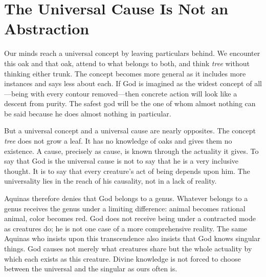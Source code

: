 \section{The Universal Cause Is Not an Abstraction}

Our minds reach a universal concept by leaving particulars behind. We encounter this oak and that oak, attend to what belongs to both, and think \emph{tree} without thinking either trunk. The concept becomes more general as it includes more instances and says less about each. If God is imagined as the widest concept of all---being with every contour removed---then concrete action will look like a descent from purity. The safest god will be the one of whom almost nothing can be said because he does almost nothing in particular.

But a universal concept and a universal cause are nearly opposites. The concept \emph{tree} does not grow a leaf. It has no knowledge of oaks and gives them no existence. A cause, precisely as cause, is known through the actuality it gives. To say that God is the universal cause is not to say that he is a very inclusive thought. It is to say that every creature's act of being depends upon him. The universality lies in the reach of his causality, not in a lack of reality.

Aquinas therefore denies that God belongs to a genus. Whatever belongs to a genus receives the genus under a limiting difference: animal becomes rational animal, color becomes red. God does not receive being under a contracted mode as creatures do; he is not one case of a more comprehensive reality. The same Aquinas who insists upon this transcendence also insists that God knows singular things. God causes not merely what creatures share but the whole actuality by which each exists as this creature. Divine knowledge is not forced to choose between the universal and the singular as ours often is.

